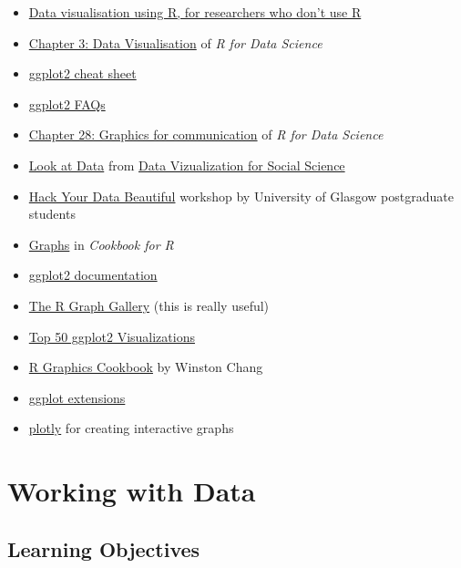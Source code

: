 \documentclass[
  oneside]{book}
\providecommand{\tightlist}{%
  \setlength{\itemsep}{0pt}\setlength{\parskip}{0pt}}
\begin{document}
\begin{itemize}
\tightlist
\item
  \href{https://psyarxiv.com/4huvw/}{Data visualisation using R, for researchers who don't use R}
\item
  \href{http://r4ds.had.co.nz/data-visualisation.html}{Chapter 3: Data Visualisation} of \emph{R for Data Science}
\item
  \href{https://github.com/rstudio/cheatsheets/raw/master/data-visualization-2.1.pdf}{ggplot2 cheat sheet}
\item
  \href{https://ggplot2.tidyverse.org/articles/}{ggplot2 FAQs}
\item
  \href{http://r4ds.had.co.nz/graphics-for-communication.html}{Chapter 28: Graphics for communication} of \emph{R for Data Science}
\item
  \href{http://socviz.co/look-at-data.html}{Look at Data} from \href{http://socviz.co/}{Data Vizualization for Social Science}
\item
  \href{https://psyteachr.github.io/hack-your-data/}{Hack Your Data Beautiful} workshop by University of Glasgow postgraduate students
\item
  \href{http://www.cookbook-r.com/Graphs}{Graphs} in \emph{Cookbook for R}
\item
  \href{https://ggplot2.tidyverse.org/reference/}{ggplot2 documentation}
\item
  \href{http://www.r-graph-gallery.com/}{The R Graph Gallery} (this is really useful)
\item
  \href{http://r-statistics.co/Top50-Ggplot2-Visualizations-MasterList-R-Code.html}{Top 50 ggplot2 Visualizations}
\item
  \href{http://www.cookbook-r.com/Graphs/}{R Graphics Cookbook} by Winston Chang
\item
  \href{https://www.ggplot2-exts.org/}{ggplot extensions}
\item
  \href{https://plot.ly/ggplot2/}{plotly} for creating interactive graphs
\end{itemize}

\hypertarget{data}{%
\chapter{Working with Data}\label{data}}

\hypertarget{ilo-data}{%
\section{Learning Objectives}\label{ilo-data}}
\end{document}
